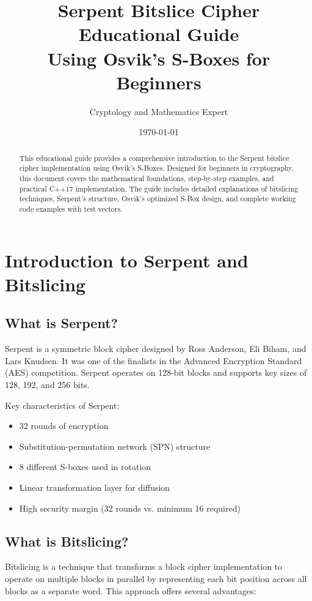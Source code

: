 \documentclass[12pt,a4paper]{article}
\title{\textbf{Serpent Bitslice Cipher Educational Guide}\\
\large Using Osvik's S-Boxes for Beginners}
\author{Cryptology and Mathematics Expert}
\date{\today}
\begin{document}
\maketitle

\begin{abstract}
This educational guide provides a comprehensive introduction to the Serpent bitslice cipher implementation using Osvik's S-Boxes. Designed for beginners in cryptography, this document covers the mathematical foundations, step-by-step examples, and practical C++17 implementation. The guide includes detailed explanations of bitslicing techniques, Serpent's structure, Osvik's optimized S-Box design, and complete working code examples with test vectors.
\end{abstract}

\tableofcontents
\newpage

\section{Introduction to Serpent and Bitslicing}

\subsection{What is Serpent?}
Serpent is a symmetric block cipher designed by Ross Anderson, Eli Biham, and Lars Knudsen. It was one of the finalists in the Advanced Encryption Standard (AES) competition. Serpent operates on 128-bit blocks and supports key sizes of 128, 192, and 256 bits.

Key characteristics of Serpent:
\begin{itemize}
    \item 32 rounds of encryption
    \item Substitution-permutation network (SPN) structure
    \item 8 different S-boxes used in rotation
    \item Linear transformation layer for diffusion
    \item High security margin (32 rounds vs. minimum 16 required)
\end{itemize}

\subsection{What is Bitslicing?}
Bitslicing is a technique that transforms a block cipher implementation to operate on multiple blocks in parallel by representing each bit position across all blocks as a separate word. This approach offers several advantages:
\end{document}
